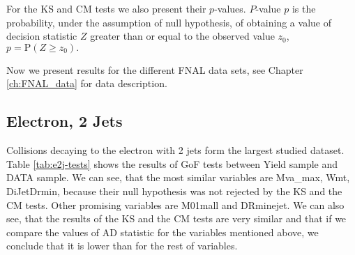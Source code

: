 For the KS and CM tests we also present their $p$-values. $P$-value $p$ is the probability, under the assumption of null hypothesis, of obtaining a value of decision statistic $Z$ greater than or equal to the observed value $z_0$, $p = \mathrm{P}(Z \geq z_0).$

Now we present results for the different FNAL data sets, see Chapter \ref{ch:FNAL_data} for data description.

\subsection{Electron, 2 Jets}

\noindent Collisions decaying to the electron with 2 jets form the largest studied dataset. Table \ref{tab:e2j-tests} shows the results of GoF tests between Yield sample and DATA sample. We can see, that the most similar variables are \textsf{Mva\_max, Wmt, DiJetDrmin}, because their null hypothesis was not rejected by the KS and the CM tests. Other promising variables are \textsf{M01mall and DRminejet}. We can also see, that the results of the KS and the CM tests are very similar and that if we compare the values of AD statistic for the variables mentioned above, we conclude that it is lower than for the rest of  variables. 

